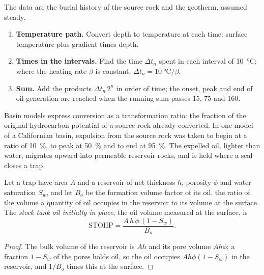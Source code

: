 \begin{method}\label{met:b2:energy-geology:tti}
The data are the burial history of the source rock and the geotherm, assumed steady.
\begin{enumerate}
  \item \textbf{Temperature path.} Convert depth to temperature at each time: surface temperature
        plus gradient times depth.
  \item \textbf{Times in the intervals.} Find the time $\Delta t_n$ spent in each interval of
        \qty{10}{\celsius}; where the heating rate $\beta$ is constant, $\Delta t_n = \qty{10}{\celsius}/\beta$.
  \item \textbf{Sum.} Add the products $\Delta t_n\,2^n$ in order of time; the onset, peak and
        end of oil generation are reached when the running sum passes 15, 75 and 160.
\end{enumerate}
\end{method}

Basin models express conversion as a transformation ratio: the fraction of the original
hydrocarbon potential of a source rock already converted. In one model of a Californian basin,
expulsion from the source rock was taken to begin at a ratio of \qty{10}{\percent}, to peak at
\qty{50}{\percent} and to end at \qty{95}{\percent}. The expelled oil, lighter than water,
migrates upward into permeable reservoir rocks, and is held where a seal closes a trap.

\begin{proposition}\label{prop:b2:energy-geology:volumetrics}
Let a trap have area $A$ and a reservoir of net thickness $h$, porosity $\phi$ and water saturation
$S_w$, and let $B_o$ be the formation volume factor of its oil, the ratio of the volume a quantity
of oil occupies in the reservoir to its volume at the surface. The \emph{stock tank oil initially
in place}, the oil volume measured at the surface, is
\begin{equation}
\mathrm{STOIIP} = \frac{A\,h\,\phi\,(1 - S_w)}{B_o} .
\label{eq:b2:energy-geology:stoiip}
\end{equation}
\end{proposition}

\begin{proof}
The bulk volume of the reservoir is $Ah$ and its pore volume $Ah\phi$; a fraction $1 - S_w$ of the
pores holds oil, so the oil occupies $Ah\phi(1 - S_w)$ in the reservoir, and $1/B_o$ times this at
the surface.
\end{proof}

